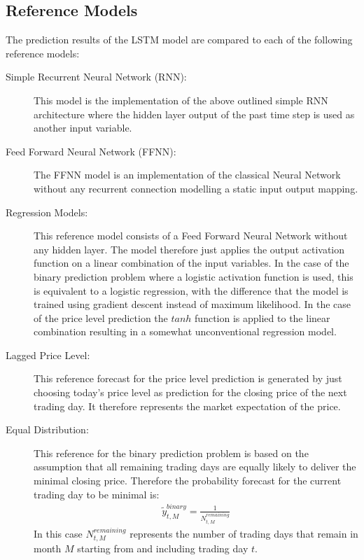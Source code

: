 \subsection{Reference Models}
The prediction results of the LSTM model are compared to each of the following reference models:
\begin{description}
\item[Simple Recurrent Neural Network (RNN):] This model is the implementation of the above outlined simple RNN architecture where the hidden layer output of the past time step is used as another input variable.
\item[Feed Forward Neural Network (FFNN):] The FFNN model is an implementation of the classical Neural Network without any recurrent connection modelling  a static input output mapping. 
\item[Regression Models:] This reference model consists of a Feed Forward Neural Network without any hidden layer. The model therefore just applies the output activation function on a linear combination of the input variables. In the case of the binary prediction problem  where a logistic activation function is used, this is equivalent to a logistic regression, with the difference that the model is trained using gradient descent instead of maximum likelihood. In the case of the price level prediction the $tanh$ function is applied to the linear combination resulting in a somewhat unconventional regression model.
\item[Lagged Price Level:] This reference forecast for the price level prediction is generated by just choosing today's price level as prediction for the closing price of the next trading day. It therefore represents the market expectation of the price.
\item[Equal Distribution:] This reference for the binary prediction problem is based on the assumption that all remaining trading days are equally likely to deliver the minimal closing price. Therefore the probability forecast for the current trading day to be minimal is: \begin{align*}
\tilde{y}^{binary}_{t,M} = \frac{1}{N^{remaining}_{t,M}}
\end{align*}
In this case $N^{remaining}_{t,M}$ represents the number of trading days that remain in month $M$ starting from and including trading day $t$.
\end{description}


